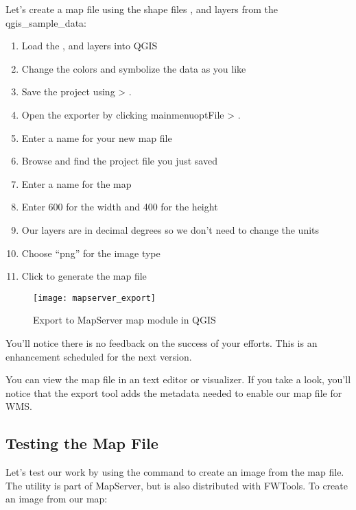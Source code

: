 Let's create a map file using the shape files ,  
and  layers from the qgis\_sample\_data:

\begin{enumerate}
  \item Load the ,  and  
  layers into QGIS
  \item Change the colors and symbolize the data as you like
  \item Save the project using  >
  .
  \item Open the exporter by clicking mainmenuopt{File} > .
  \item Enter a name for your new map file
  \item Browse and find the project file you just saved
  \item Enter a name for the map
  \item Enter 600 for the width and 400 for the height
  \item Our layers are in decimal degrees so we don't need to change the
    units
  \item Choose ``png'' for the image type
  \item Click  to generate the map file
\end{enumerate}


\begin{figure}[ht]
\begin{center}
  \caption{Export to MapServer map module in QGIS}\label{fig:mapserver_export}\smallskip
  \texttt{[image: mapserver\_export]}
\end{center}
\end{figure}

You'll notice there is no feedback on the success of your efforts. This
is an enhancement scheduled for the next version. 

You can view the map file in an text editor or visualizer. If you
take a look, you'll notice that the export tool adds the metadata needed
to enable our map file for WMS. 

\subsection{Testing the Map File}

Let's test our work by using the  command to create an image
from the map file. The   utility is part of MapServer,
but is also distributed with FWTools. To create an image from our map:

